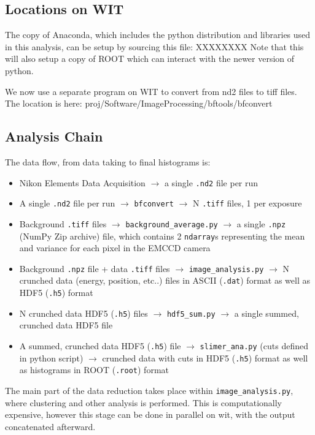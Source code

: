 \documentclass[11pt]{amsart}
\begin{document}
\subsection{Locations on WIT}
The copy of Anaconda, which includes the python distribution and libraries used in this analysis, can be setup by sourcing this file:
XXXXXXXX
Note that this will also setup a copy of ROOT which can interact with the newer version of python. 

We now use a separate program on WIT to convert from nd2 files to tiff files. The location is here:
proj/Software/ImageProcessing/bftools/bfconvert


\subsection{Analysis Chain}
The data flow, from data taking to final histograms is:
\begin{itemize}
	\item Nikon Elements Data Acquisition $\rightarrow$ a single \verb+.nd2+ file per run
	\item A single \verb+.nd2+ file per run $\rightarrow$ \verb+bfconvert+ $\rightarrow$ N \verb+.tiff+ files, 1 per exposure
	\item  Background \verb+.tiff+ files $\rightarrow$ \verb+background_average.py+ $\rightarrow$ a single \verb+.npz+ (NumPy Zip archive) file, which contains 2 \verb+ndarray+s representing the mean and variance for each pixel in the EMCCD camera
	\item Background  \verb+.npz+ file + data \verb+.tiff+ files  $\rightarrow$ \verb+image_analysis.py+ $\rightarrow$ N crunched data  (energy, position, etc..) files in ASCII (\verb+.dat+) format as well as HDF5 (\verb+.h5+) format
	\item  N crunched data HDF5 (\verb+.h5+) files $\rightarrow$  \verb+hdf5_sum.py+ $\rightarrow$ a single summed, crunched data HDF5 file 
	\item A summed, crunched data HDF5 (\verb+.h5+) file  $\rightarrow$ \verb+slimer_ana.py+ (cuts defined in python script) $\rightarrow$ crunched data with cuts in HDF5 (\verb+.h5+) format as well as histograms in ROOT (\verb+.root+) format
	\end{itemize}
The main part of the data reduction takes place within \verb+image_analysis.py+, where clustering and other analysis is performed. This is computationally expensive, however this stage can be done in parallel on wit, with the output concatenated afterward. 
\end{document}
